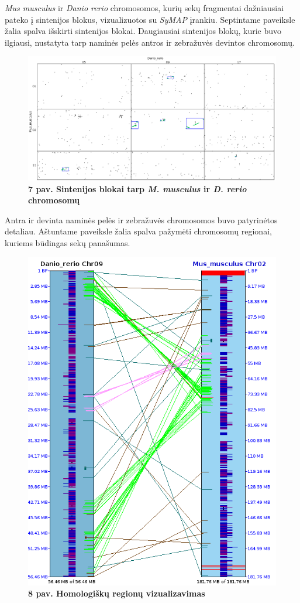 \documentclass[12pt]{article}
\begin{document}
\emph{Mus musculus} ir \emph{Danio rerio} chromosomos, kurių sekų fragmentai
dažniausiai pateko į sintenijos blokus, vizualizuotos su \emph{SyMAP} įrankiu.
Septintame paveiksle žalia spalva išskirti sintenijos blokai. Daugiausiai
sintenijos blokų, kurie buvo ilgiausi, nustatyta tarp naminės pelės antros
ir zebražuvės devintos chromosomų.

\newpage

\begin{figure}[htb]
    \begin{center}
        \includegraphics[width=0.8\linewidth]{../Figures/Blocks_Chr2_9.png}
        \vspace{-1\baselineskip}
        \caption*{\small\textbf{7 pav. Sintenijos blokai tarp \emph{M. musculus}
                                ir \emph{D. rerio} chromosomų}}
        \label{fig:7}
    \end{center}
\end{figure}

Antra ir devinta naminės pelės ir zebražuvės chromosomos buvo patyrinėtos
detaliau. Aštuntame paveiksle žalia spalva pažymėti chromosomų regionai, kuriems
būdingas sekų panašumas.

\begin{figure}[htb]
    \begin{center}
        \includegraphics[width=0.4\linewidth]{../Figures/Chr2_9_synteny.png}
        \vspace{-1\baselineskip}
        \caption*{\small\textbf{8 pav. Homologiškų regionų vizualizavimas}}
        \label{fig:8}
    \end{center}
\end{figure}
\end{document}
